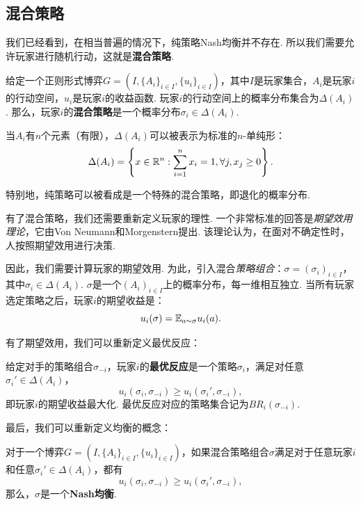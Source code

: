 \subsection{混合策略}\label{sec:mixed-strategy}
我们已经看到，在相当普遍的情况下，纯策略Nash均衡并不存在. 所以我们需要允许玩家进行随机行动，这就是\textbf{混合策略}. 

\begin{definition}[混合策略]
给定一个正则形式博弈$G=(I,\{A_i\}_{i\in I},\{u_i\}_{i\in I})$，其中$I$是玩家集合，$A_i$是玩家$i$的行动空间，$u_i$是玩家$i$的收益函数. 玩家$i$的行动空间上的概率分布集合为$\Delta(A_i)$. 那么，玩家$i$的\textbf{混合策略}是一个概率分布$\sigma_i\in\Delta(A_i)$. 
\end{definition}

当$A_i$有$n$个元素（有限），$\Delta(A_i)$可以被表示为标准的$n$-单纯形：
    \[\Delta(A_i)=\left\{x\in\mathbb{R}^n:\sum_{i=1}^n x_i=1,\forall j,x_j\geq 0\right\}.\]

特别地，纯策略可以被看成是一个特殊的混合策略，即退化的概率分布.

有了混合策略，我们还需要重新定义玩家的理性. 一个非常标准的回答是\textit{期望效用理论}，它由Von Neumann和Morgenstern提出. 该理论认为，在面对不确定性时，人按照期望效用进行决策. 


因此，我们需要计算玩家的期望效用. 为此，引入混合\textit{策略组合}：$\sigma=(\sigma_i)_{i\in I}$，其中$\sigma_i\in\Delta(A_i)$. $\sigma$是一个$(A_i)_{i\in I}$上的概率分布，每一维相互独立. 当所有玩家选定策略之后，玩家$i$的期望收益是：
    \[u_i(\sigma)=\mathbb{E}_{a\sim\sigma} u_i(a).\]

有了期望效用，我们可以重新定义最优反应：

\begin{definition}[最优反应]
给定对手的策略组合$\sigma_{-i}$，玩家$i$的\textbf{最优反应}是一个策略$\sigma_i$，满足对任意$\sigma_i'\in \Delta(A_i)$，
    \[u_i(\sigma_i,\sigma_{-i})\geq u_i(\sigma_i',\sigma_{-i}),\]
即玩家$i$的期望收益最大化. 最优反应对应的策略集合记为$BR_i(\sigma_{-i})$.
\end{definition}

最后，我们可以重新定义均衡的概念：

\begin{definition}[Nash均衡]
对于一个博弈$G=(I,\{A_i\}_{i\in I},\{u_i\}_{i\in I})$，如果混合策略组合$\sigma$满足对于任意玩家$i$和任意$\sigma_i'\in \Delta(A_i)$，都有
\[u_i(\sigma_i,\sigma_{-i})\geq u_i(\sigma_i',\sigma_{-i}),\]
那么，$\sigma$是一个\textbf{Nash均衡}.
\end{definition}

